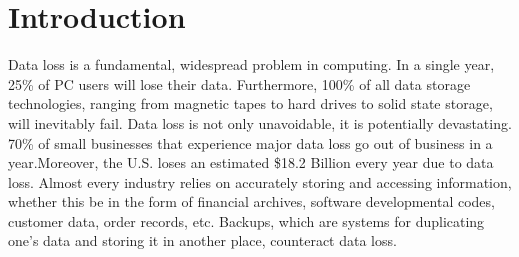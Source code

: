 \chapter{Introduction}
Data loss is a fundamental, widespread problem in computing. In a single year, 25\% of PC users will lose their data. Furthermore, 100\% of all data storage technologies, ranging from magnetic tapes to hard drives to solid state storage, will inevitably fail.  Data loss is not only unavoidable, it is potentially devastating. 70\% of small businesses that experience major data loss go out of business in a year.\footnotemark[1] Moreover, the U.S. loses an estimated \$18.2 Billion every year due to data loss.  Almost every industry relies on accurately storing and accessing information, whether this be in the form of financial archives, software developmental codes, customer data, order records, etc. Backups, which are systems for duplicating one’s data and storing it in another place, counteract data loss.


